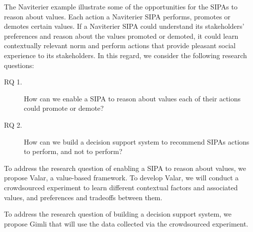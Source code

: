 \documentclass[11pt,          %
               phd,           %
               onehalfspacing %
               ]{ncsuthesis}
\newcommand{\frameworkC}{Valar\xspace}
\newcommand{\frameworkD}{Gimli\xspace}
\newcommand{\navigationapp}{Naviterier\xspace}
\newcommand{\nsa}[1]{\textcolor{green!50!black}{NSA:~~#1}}
\begin{document}
The \navigationapp example illustrate some of the opportunities for the
SIPAs to reason about values. Each action a \navigationapp SIPA performs,
promotes or demotes certain values. If a \navigationapp SIPA could
understand its stakeholders' preferences and reason about the values
promoted or demoted, it could learn contextually relevant norm and
perform actions that provide pleasant social experience to its
stakeholders. In this regard, we consider the following research questions: 

\begin{description}
\item[RQ 1.] How can we enable a SIPA to reason about values each of
their actions could promote or demote?
\item[RQ 2.] How can we build a decision support system to recommend
SIPAs actions to perform, and not to perform?
\end{description}

To address the research question of enabling a SIPA to reason about
values, we propose \frameworkC, a value-based framework. To develop
\frameworkC, we will conduct a crowdsourced experiment to learn different
contextual factors and associated values, and preferences and tradeoffs
between them.

To address the research question of building a decision support system,
we propose \frameworkD that will use the data collected via the
crowdsourced experiment.

\end{document}
